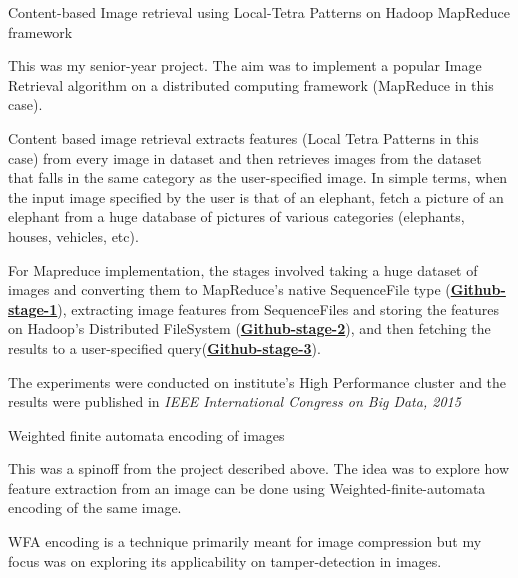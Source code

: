 
\begin{cventries}
  \majprojentry
    {Content-based Image retrieval using Local-Tetra Patterns on Hadoop MapReduce framework}
    {
      \begin{cvitems} %
        \item {This was my senior-year project. The aim was to implement a popular Image Retrieval algorithm on a distributed computing framework (MapReduce in this case).}
        \item {Content based image retrieval extracts features (Local Tetra Patterns in this case) from every image in dataset and then retrieves images from the dataset that falls in the same category as the user-specified image. In simple terms, when the input image specified by the user is that of an elephant, fetch a picture of an elephant from a huge database of pictures of various categories (elephants, houses, vehicles, etc).}
        \item {For Mapreduce implementation, the stages involved taking a huge dataset of images and converting them to MapReduce's native SequenceFile type (\textbf{\href{https://github.com/sg1993/sequencify-CBIR-on-hadoop}{Github-stage-1}}), extracting image features from SequenceFiles and storing the features on Hadoop's Distributed FileSystem (\textbf{\href{https://github.com/sg1993/CBIR-on-Hadoop}{Github-stage-2}}), and then fetching the results to a user-specified query(\textbf{\href{https://github.com/sg1993/CBIR-query-on-Hadoop}{Github-stage-3}}).}
        \item {The experiments were conducted on institute's High Performance cluster and the results were published in \textit{IEEE International Congress on Big Data, 2015}}
      \end{cvitems}
    }
  \majprojentry
    {Weighted finite automata encoding of images}
    {
      \begin{cvitems} %
        \item {This was a spinoff from the project described above. The idea was to explore how feature extraction from an image can be done using Weighted-finite-automata encoding of the same image.}
        \item {WFA encoding is a technique primarily meant for image compression but my focus was on exploring its applicability on tamper-detection in images.}

\end{cvitems}}
\end{cventries}
